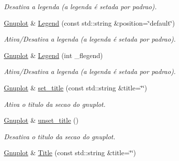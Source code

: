 \begin{DoxyCompactItemize}
\begin{DoxyCompactList}\small\item\em Desativa a legenda (a legenda é setada por padrao). \end{DoxyCompactList}\item 
\hypertarget{classGnuplot_aec3037a558d26535e3847c52d1b120aa}{\hyperlink{classGnuplot}{Gnuplot} \& \hyperlink{classGnuplot_aec3037a558d26535e3847c52d1b120aa}{Legend} (const std\-::string \&position=\char`\"{}default\char`\"{})}\label{classGnuplot_aec3037a558d26535e3847c52d1b120aa}

\begin{DoxyCompactList}\small\item\em Ativa/\-Desativa a legenda (a legenda é setada por padrao). \end{DoxyCompactList}\item 
\hypertarget{classGnuplot_a781ffec9b2ddd9706823b865acb95d0b}{\hyperlink{classGnuplot}{Gnuplot} \& \hyperlink{classGnuplot_a781ffec9b2ddd9706823b865acb95d0b}{Legend} (int \-\_\-flegend)}\label{classGnuplot_a781ffec9b2ddd9706823b865acb95d0b}

\begin{DoxyCompactList}\small\item\em Ativa/\-Desativa a legenda (a legenda é setada por padrao). \end{DoxyCompactList}\item 
\hypertarget{classGnuplot_aa693e806a115af1e2776a15078e75b46}{\hyperlink{classGnuplot}{Gnuplot} \& \hyperlink{classGnuplot_aa693e806a115af1e2776a15078e75b46}{set\-\_\-title} (const std\-::string \&title=\char`\"{}\char`\"{})}\label{classGnuplot_aa693e806a115af1e2776a15078e75b46}

\begin{DoxyCompactList}\small\item\em Ativa o titulo da secao do gnuplot. \end{DoxyCompactList}\item 
\hypertarget{classGnuplot_a0d205a55ae104403292622b49af14ae7}{\hyperlink{classGnuplot}{Gnuplot} \& \hyperlink{classGnuplot_a0d205a55ae104403292622b49af14ae7}{unset\-\_\-title} ()}\label{classGnuplot_a0d205a55ae104403292622b49af14ae7}

\begin{DoxyCompactList}\small\item\em Desativa o titulo da secao do gnuplot. \end{DoxyCompactList}\item 
\hypertarget{classGnuplot_a73bb8c97a946cafea0eca683450a6a62}{\hyperlink{classGnuplot}{Gnuplot} \& \hyperlink{classGnuplot_a73bb8c97a946cafea0eca683450a6a62}{Title} (const std\-::string \&title=\char`\"{}\char`\"{})}\label{classGnuplot_a73bb8c97a946cafea0eca683450a6a62}


\end{DoxyCompactItemize}
